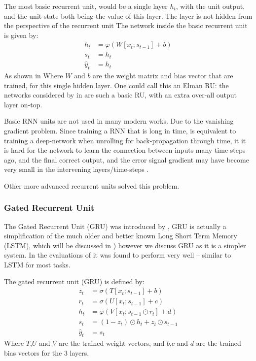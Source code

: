 \documentclass[12pt,parskip]{komatufte}
\begin{document}
The most basic recurrent unit, would be a single layer $h_t$, with the unit output, and the unit state both being the value of this layer.
The layer is not hidden from the perspective of the recurrent unit
The network inside the basic recurrent unit is given by:
\begin{align}
h_t &= \varphi\left(W[x_t; s_{t-1}]+ b \right)\\
s_t & = h_t \\
\hat{y}_t &= h_t
\end{align}
As shown in 
Where $W$ and $b$ are the weight matrix and bias vector that are trained, for this single hidden layer.
One could call this an Elman RU:
the networks considered by in  are such a basic RU, with an extra over-all output layer on-top.

Basic RNN units are not used in many modern works.
Due to the vanishing gradient problem. 
Since training a RNN that is long in time, is equivalent to training a deep-network when unrolling for back-propagation through time,
it it is hard for the network to learn the connection between inputs many time steps ago, and the final correct output, and the error signal gradient may have become very small in the intervening layers/time-steps .

Other more advanced recurrent units solved this problem.

\subsubsection{Gated Recurrent Unit}
The Gated Recurrent Unit (GRU) was introduced by ,
GRU is actually a simplification of the much older and better known Long Short Term Memory (LSTM),
 which will be discussed in ) however we discuss GRU as it is a simpler system.
In the evaluations of   it was found to perform very well -- similar to LSTM for most tasks.


The gated recurrent unit (GRU) is defined by:
\begin{align}
z_t &= \sigma \left( T[x_t; s_{t-1}] + b \right) \\
r_t &= \sigma \left( U[x_t; s_{t-1}] + c \right) \\
%
h_t &= \varphi \left( V[x_t; s_{t-1} \odot r_t] + d \right)  \\
s_t &= (1-z_t) \odot h_t + z_t\odot s_{t-1}\\
\hat{y}_t &= s_t
\end{align}
Where $T$,$U$ and $V$ are the trained weight-vectors, and $b$,$c$ and $d$ are the trained bias vectors for the 3 layers.
\end{document}
